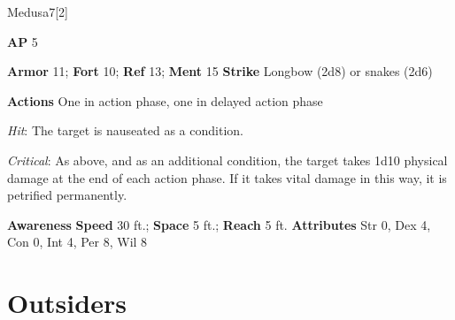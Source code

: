 \begin{monsection}{Medusa}{7}[2]
\vspace{-1em}\vspace{-1em}
\begin{spellcontent}
\begin{spelltargetinginfo}
{\textbf{AP} 5}

\pari \textbf{Armor} 11;
\textbf{Fort} 10;
\textbf{Ref} 13;
\textbf{Ment} 15
\pari \textbf{Strike} Longbow  (2d8) or snakes  (2d6)


\pari \textbf{Actions} One in action phase, one in delayed action phase
\end{spelltargetinginfo}


\begin{spelleffects}

\pari

\par


\par \textit{Hit}: The target is nauseated as a condition.
\par \textit{Critical}:
As above, and as an additional condition, the target takes 1d10 physical damage at the end of each action phase.
If it takes vital damage in this way, it is petrified permanently.


\end{spelleffects}

\end{spellcontent}

\begin{monsterfooter}
\pari \textbf{Awareness} 
\pari \textbf{Speed} 30 ft.;
\textbf{Space} 5 ft.;
\textbf{Reach} 5 ft.
\pari \textbf{Attributes}
Str 0,
Dex 4,
Con 0,
Int 4,
Per 8,
Wil 8
\end{monsterfooter}
\end{monsection}


\section{Outsiders}

